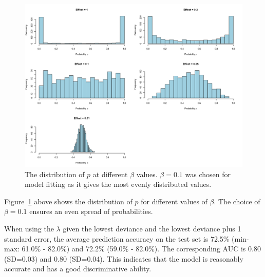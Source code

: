 \documentclass[12pt]{article}
\begin{document}
\begin{figure}[H]
    \centering
    \includegraphics[width=\textwidth]{../Figures/sim1_p_dist.png}
    \caption{The distribution of \(p\) at different \(\beta\) values. \(\beta = 0.1\) was chosen for model fitting as it gives the most evenly distributed values.}
    \label{fig:sim1_p_dist}
\end{figure}

Figure~\ref{fig:sim1_p_dist} above shows the distribution of \(p\) for different values of \(\beta\). The choice of \(\beta = 0.1\) ensures an even spread of probabilities.

When using the \(\lambda\) given the lowest deviance and the lowest deviance plus 1 standard error, the average prediction accuracy on the test set is 72.5\% (min-max: 61.0\% - 82.0\%) and 72.2\% (59.0\% - 82.0\%). The corresponding AUC is 0.80 (SD=0.03) and 0.80 (SD=0.04). This indicates that the model is reasonably accurate and has a good discriminative ability.
\end{document}
